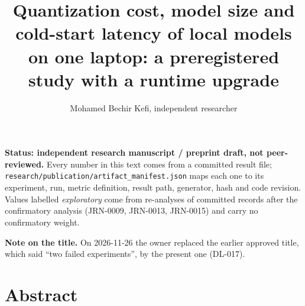 \documentclass[
]{article}
\title{Quantization cost, model size and cold-start latency of local
models on one laptop: a preregistered study with a runtime upgrade}
\author{Mohamed Bechir Kefi, independent researcher}
\date{}
\begin{document}
\maketitle

\textbf{Status: independent research manuscript / preprint draft, not
peer-reviewed.} Every number in this text comes from a committed result
file; \texttt{research/publication/artifact\_manifest.json} maps each
one to its experiment, run, metric definition, result path, generator,
hash and code revision. Values labelled \emph{exploratory} come from
re-analyses of committed records after the confirmatory analysis
(JRN-0009, JRN-0013, JRN-0015) and carry no confirmatory weight.

\textbf{Note on the title.} On 2026-11-26 the owner replaced the earlier
approved title, which said ``two failed experiments'', by the present
one (DL-017).

\section{Abstract}\label{abstract}
\end{document}
